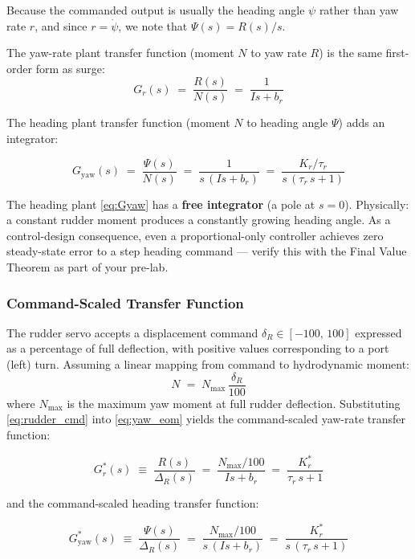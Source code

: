 \documentclass[11pt]{article}
\begin{document}
Because the commanded output is usually the heading angle $\psi$ rather
than yaw rate $r$, and since $r = \dot\psi$, we note that
$\Psi(s) = R(s)/s$.

The yaw-rate plant transfer function (moment $N$ to yaw rate $R$) is the
same first-order form as surge:
\[
  G_r(s) \;=\; \frac{R(s)}{N(s)} \;=\; \frac{1}{Is + b_r}
\]

The heading plant transfer function (moment $N$ to heading angle $\Psi$)
adds an integrator:

\begin{equation}
  G_{\mathrm{yaw}}(s)
  \;=\; \frac{\Psi(s)}{N(s)}
  \;=\; \frac{1}{s\,(Is + b_r)}
  \;=\; \frac{K_r/\tau_r}{s\,(\tau_r\,s + 1)}
  \label{eq:Gyaw}
\end{equation}

  The heading plant \eqref{eq:Gyaw} has a \textbf{free integrator} (a pole
  at $s = 0$).  Physically: a constant rudder moment produces a constantly
  growing heading angle.  As a control-design consequence, even a
  proportional-only controller achieves zero steady-state error to a step
  heading command --- verify this with the Final Value Theorem as part of
  your pre-lab.

\subsubsection{Command-Scaled Transfer Function}

The rudder servo accepts a displacement command $\delta_R \in [-100,\,100]$
expressed as a percentage of full deflection, with positive values
corresponding to a port (left) turn.  Assuming a linear mapping from
command to hydrodynamic moment:
\begin{equation}
  N \;=\; N_{\max}\,\frac{\delta_R}{100}
  \label{eq:rudder_cmd}
\end{equation}
where $N_{\max}$ is the maximum yaw moment at full rudder deflection.
Substituting \eqref{eq:rudder_cmd} into \eqref{eq:yaw_eom} yields the
command-scaled yaw-rate transfer function:

\begin{equation}
  G_r^*(s)
  \;\equiv\; \frac{R(s)}{\Delta_R(s)}
  \;=\; \frac{N_{\max}/100}{Is + b_r}
  \;=\; \frac{K_r^*}{\tau_r\,s + 1}
  \label{eq:Gr_cmd}
\end{equation}

and the command-scaled heading transfer function:

\begin{equation}
  G_{\mathrm{yaw}}^*(s)
  \;\equiv\; \frac{\Psi(s)}{\Delta_R(s)}
  \;=\; \frac{N_{\max}/100}{s\,(Is + b_r)}
  \;=\; \frac{K_r^*}{s\,(\tau_r\,s + 1)}
  \label{eq:Gyaw_cmd}
\end{equation}
\end{document}
